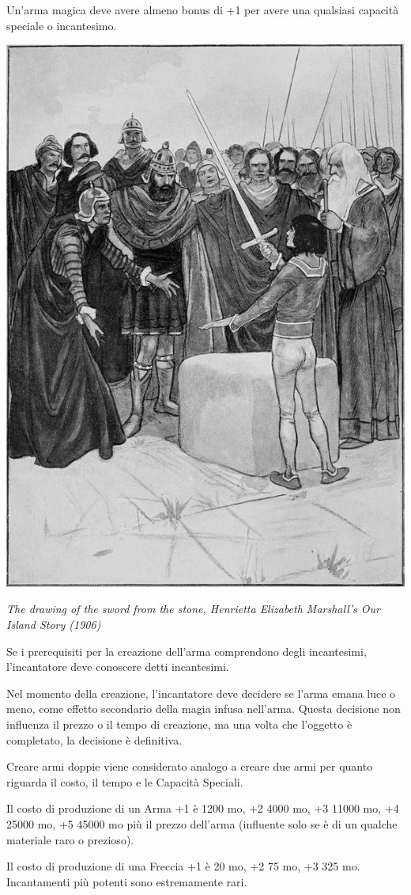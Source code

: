 \begin{multicols}{2}
Un'arma magica deve avere almeno bonus di +1 per avere una qualsiasi capacità speciale o incantesimo.

\medskip

\begin{center}
\includegraphics[width=0.6\linewidth]{immagini/exacaliburfuori.png}

\textit{The drawing of the sword from the stone, Henrietta Elizabeth Marshall's Our Island Story (1906)}
\end{center}

\medskip

Se i prerequisiti per la creazione dell'arma comprendono degli incantesimi, l'incantatore deve conoscere detti incantesimi.

Nel momento della creazione, l'incantatore deve decidere se l'arma emana luce o meno, come effetto secondario della magia infusa nell'arma. Questa decisione non influenza il prezzo o il tempo di creazione, ma una volta che l'oggetto è completato, la decisione è definitiva.

Creare armi doppie viene considerato analogo a creare due armi per quanto riguarda il costo, il tempo e le Capacità Speciali.

Il costo di produzione di un Arma +1 è 1200 mo, +2 4000 mo, +3 11000 mo, +4 25000 mo, +5 45000 mo più il prezzo dell'arma (influente solo se è di un qualche materiale raro o prezioso).

Il costo di produzione di una Freccia +1 è 20 mo, +2 75 mo, +3 325 mo. Incantamenti più potenti sono estremamente rari.


\end{multicols}

